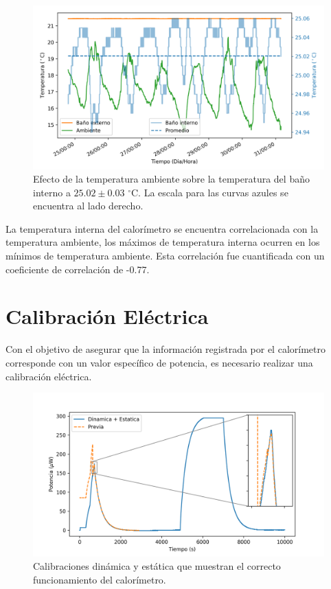 \documentclass[a0]{sciposter}
\newcommand{\grad}{$^\circ$C}
\newcommand{\figwidth}{0.7\linewidth}
\begin{document}
\begin{multicols}{3}
	\begin{figure}[h]
		\centering
		\includegraphics[width=\figwidth]{../Data/TemperatureStability/temperatureStability}
		\caption{Efecto de la temperatura ambiente sobre la temperatura del baño interno a $25.02\pm0.03$ \grad{}. La escala para las curvas azules se encuentra al lado derecho.}
	\end{figure}
	
	La temperatura interna del calorímetro se encuentra correlacionada con la temperatura ambiente, los máximos de temperatura interna ocurren en los mínimos de temperatura ambiente. Esta correlaci\'on fue cuantificada con un coeficiente de correlaci\'on de -0.77.

\section{Calibraci\'on El\'ectrica}
	Con el objetivo de asegurar que la información registrada por el calorímetro corresponde con un valor específico de potencia, es necesario realizar una calibración eléctrica.
	\begin{figure}[h]
		\centering
		\includegraphics[width=\figwidth]{../Data/ElectricalCalibrations/Both}
		\caption{Calibraciones dinámica y estática que muestran el correcto funcionamiento del calorímetro.}
	\end{figure}


\end{multicols}
\end{document}

